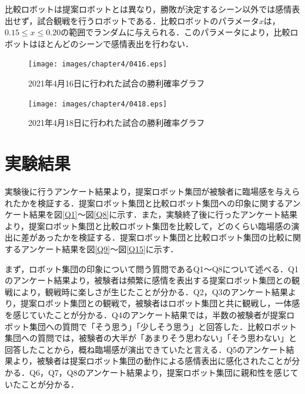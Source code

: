 比較ロボットは提案ロボットとは異なり，勝敗が決定するシーン以外では感情表出せず，試合観戦を行うロボットである．比較ロボットのパラメータ$x$は，$0.15 \leq x \leq 0.20$の範囲でランダムに与えられる．このパラメータにより，比較ロボットはほとんどのシーンで感情表出を行わない．

\newpage

\vspace{1cm}
\begin{figure}[!h]
 \begin{center}
  \centering
  \texttt{[image: images/chapter4/0416.eps]}
  \caption{2021年4月16日に行われた試合の勝利確率グラフ}
  \label{0416}
 \end{center}
\end{figure}


\vspace{1cm}
\begin{figure}[!h]
 \begin{center}
  \centering
  \texttt{[image: images/chapter4/0418.eps]}
  \caption{2021年4月18日に行われた試合の勝利確率グラフ}
  \label{0418}
 \end{center}
\end{figure}


\newpage


\section{実験結果}
\label{sec4.3}

実験後に行うアンケート結果より，提案ロボット集団が被験者に臨場感を与えられたかを検証する．提案ロボット集団と比較ロボット集団への印象に関するアンケート結果を図\ref{Q1}～図\ref{Q8}に示す．また，実験終了後に行ったアンケート結果より，提案ロボット集団と比較ロボット集団を比較して，どのくらい臨場感の演出に差があったかを検証する．提案ロボット集団と比較ロボット集団の比較に関するアンケート結果を図\ref{Q9}～図\ref{Q15}に示す．

まず，ロボット集団の印象について問う質問であるQ1～Q8について述べる．Q1のアンケート結果より，被験者は頻繁に感情を表出する提案ロボット集団との観戦により，観戦時に楽しさが生じたことが分かる．Q2，Q3のアンケート結果より，提案ロボット集団との観戦で，被験者はロボット集団と共に観戦し，一体感を感じていたことが分かる．Q4のアンケート結果では，半数の被験者が提案ロボット集団への質問で「そう思う」「少しそう思う」と回答した．比較ロボット集団への質問では，被験者の大半が「あまりそう思わない」「そう思わない」と回答したことから，概ね臨場感が演出できていたと言える．Q5のアンケート結果より，被験者は提案ロボット集団の動作による感情表出に感化されたことが分かる．Q6，Q7，Q8のアンケート結果より，提案ロボット集団に親和性を感じていたことが分かる．


